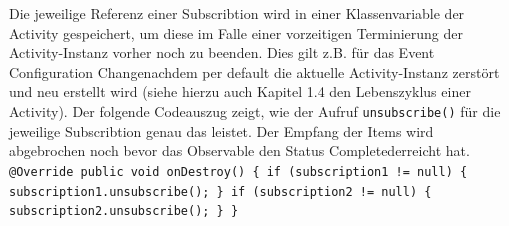 \documentclass[12pt,oneside,a4paper,bibtotoc,liststotoc]{scrreprt}
\begin{document}
Die jeweilige Referenz einer Subscribtion wird in einer Klassenvariable der Activity gespeichert, um diese im Falle einer vorzeitigen Terminierung der Activity-Instanz vorher noch zu beenden. Dies gilt z.B. für das Event \grqq Configuration Change\grqq nachdem per default die aktuelle Activity-Instanz zerstört und neu erstellt wird (siehe hierzu auch Kapitel 1.4 den Lebenszyklus einer Activity). Der folgende Codeauszug zeigt, wie der Aufruf \texttt{unsubscribe()} für die jeweilige Subscribtion genau das leistet. Der Empfang der Items wird abgebrochen noch bevor das Observable den Status \grqq Completed\grqq erreicht hat.\newline
\texttt{\newline
@Override\newline
   public void onDestroy() \{\newline
       if (subscription1 != null) \{\newline
           subscription1.unsubscribe();\newline
       \}\newline
       if (subscription2 != null) \{\newline
           subscription2.unsubscribe();\newline
       \}\newline
   \}\newline
}
\end{document}
